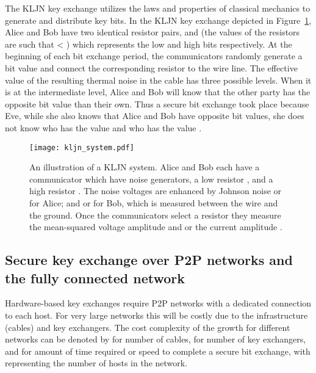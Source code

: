 \documentclass[a4paper,12pt,pdftex]{article}
\begin{document}
The KLJN key exchange utilizes the laws and properties of classical mechanics \cite{kljn1} to generate and distribute key bits. In the KLJN key exchange depicted in Figure~\ref{fig:kljn_sys}, Alice and Bob have two identical resistor pairs,  and  (the values of the resistors are such that  < ) which represents the low  and high  bits respectively. At the beginning of each bit exchange period, the communicators randomly generate a bit value and connect the corresponding resistor to the wire line. The effective value of the resulting thermal noise in the cable has three possible levels. When it is at the intermediate level, Alice and Bob will know that the other party has the opposite bit value than their own. Thus a secure bit exchange took place because Eve, while she also knows that Alice and Bob have opposite bit values, she does not know who has the  value and who has the  value \cite{kljn1, lk2}.

\begin{figure}[h]
    \caption{An illustration of a KLJN system. Alice and Bob each have a communicator which have noise generators, a low resistor , and a high resistor . The noise voltages are enhanced by Johnson noise  or  for Alice; and  or  for Bob, which is measured between the wire and the ground. Once the communicators select a resistor they measure the mean-squared voltage amplitude  and or the current amplitude .}
    \label{fig:kljn_sys}
  \centering
\texttt{[image: kljn\_system.pdf]}
\end{figure}



\subsection{Secure key exchange over P2P networks and the fully connected network}

Hardware-based key exchanges require P2P networks with a dedicated connection to each host. For very large networks this will be costly due to the infrastructure (cables) and key exchangers. The cost complexity of the growth for different networks can be denoted by  for number of cables,  for number of key exchangers, and  for amount of time required or speed to complete a secure bit exchange, with  representing the number of hosts in the network. 
\end{document}
